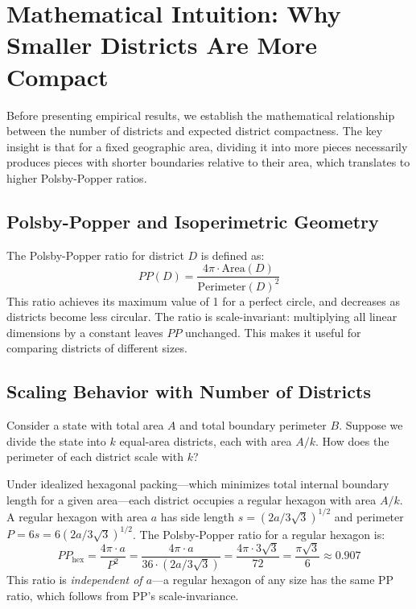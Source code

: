 \section{Mathematical Intuition: Why Smaller Districts Are More Compact}
\label{sec:math}

Before presenting empirical results, we establish the mathematical relationship between the number of districts and expected district compactness. The key insight is that for a fixed geographic area, dividing it into more pieces necessarily produces pieces with shorter boundaries relative to their area, which translates to higher Polsby-Popper ratios.

\subsection{Polsby-Popper and Isoperimetric Geometry}

The Polsby-Popper ratio for district $D$ is defined as:
\begin{equation}
  PP(D) = \frac{4\pi \cdot \text{Area}(D)}{\text{Perimeter}(D)^2}
  \label{eq:pp}
\end{equation}
This ratio achieves its maximum value of 1 for a perfect circle, and decreases as districts become less circular. The ratio is scale-invariant: multiplying all linear dimensions by a constant leaves $PP$ unchanged. This makes it useful for comparing districts of different sizes.

\subsection{Scaling Behavior with Number of Districts}

Consider a state with total area $A$ and total boundary perimeter $B$. Suppose we divide the state into $k$ equal-area districts, each with area $A/k$. How does the perimeter of each district scale with $k$?

Under idealized hexagonal packing---which minimizes total internal boundary length for a given area---each district occupies a regular hexagon with area $A/k$. A regular hexagon with area $a$ has side length $s = (2a/3\sqrt{3})^{1/2}$ and perimeter $P = 6s = 6(2a/3\sqrt{3})^{1/2}$. The Polsby-Popper ratio for a regular hexagon is:
\begin{equation}
  PP_{\text{hex}} = \frac{4\pi \cdot a}{P^2} = \frac{4\pi \cdot a}{36 \cdot (2a/3\sqrt{3})} = \frac{4\pi \cdot 3\sqrt{3}}{72} = \frac{\pi\sqrt{3}}{6} \approx 0.907
  \label{eq:hexpp}
\end{equation}
This ratio is \textit{independent of $a$}---a regular hexagon of any size has the same PP ratio, which follows from PP's scale-invariance.

